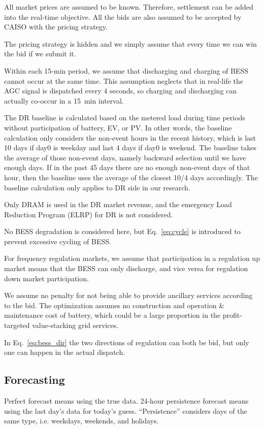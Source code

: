 \documentclass[conference]{IEEEtran}
\begin{document}
All market prices are assumed to be known. Therefore, settlement can be added into the real-time objective. All the bids are also assumed to be accepted by CAISO with the pricing strategy.

The pricing strategy is hidden and we simply assume that every time we can win the bid if we submit it.

Within each 15-min period, we assume that discharging and charging of BESS cannot occur at the same time.  This assumption neglects that in real-life the AGC signal is dispatched every 4 seconds, so charging and discharging can actually co-occur in a 15~min interval.

The DR baseline is calculated based on the metered load during time periods without participation of battery, EV, or PV. In other words, the baseline calculation only considers the non-event hours in the recent history, which is last 10 days if day0 is weekday and last 4 days if day0 is weekend. The baseline takes the average of those non-event days, namely backward selection until we have enough days. If in the past 45 days there are no enough non-event days of that hour, then the baseline uses the average of the closest 10/4 days accordingly. The baseline calculation only applies to DR side in our research.

Only DRAM is used in the DR market revenue, and the emergency Load Reduction Program (ELRP) for DR is not considered.

No BESS degradation is considered here, but Eq.~\ref{eq:cycle} is introduced to prevent excessive cycling of BESS.

For frequency regulation markets, we assume that participation in a regulation up market means that the BESS can only discharge, and vice versa for regulation down market participation.

We assume no penalty for not being able to provide ancillary services according to the bid. The optimization assumes no construction and operation \& maintenance cost of battery, which could be a large proportion in the profit-targeted value-stacking grid services.


In Eq.~\ref{eq:bess_dir} the two directions of regulation can both be bid, but only one can happen in the actual dispatch.


\subsection{Forecasting}
Perfect forecast means using the true data. 24-hour persistence forecast means using the last day's data for today's guess. ``Persistence'' considers days of the same type, i.e. weekdays, weekends, and holidays.
\end{document}
